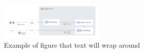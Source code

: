 \begin{figure}
    \centering
    \includegraphics[width=0.45\textwidth]{Resources/Images/Workflow2.png}
    \caption{Example of figure that text will wrap around}
    \label{fig:UM_interview_wordcloud}
\end{figure}
\lipsum[1]
\lipsum[2]


